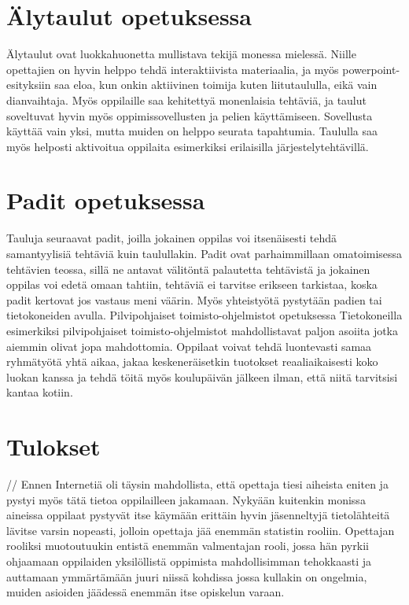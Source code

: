 \documentclass[utf8,bachelor]{gradu3}
\begin{document}
\section{Älytaulut opetuksessa}
Älytaulut ovat luokkahuonetta mullistava tekijä monessa mielessä. Niille opettajien on hyvin helppo tehdä interaktiivista materiaalia, ja myös powerpoint-esityksiin saa eloa, kun onkin aktiivinen toimija kuten liitutaululla, eikä vain dianvaihtaja. Myös oppilaille saa kehitettyä monenlaisia tehtäviä, ja taulut soveltuvat hyvin myös oppimissovellusten ja pelien käyttämiseen. Sovellusta käyttää vain yksi, mutta muiden on helppo seurata tapahtumia. Taululla saa myös helposti aktivoitua oppilaita esimerkiksi erilaisilla järjestelytehtävillä.

\section{Padit opetuksessa}
Tauluja seuraavat padit, joilla jokainen oppilas voi itsenäisesti tehdä samantyylisiä tehtäviä kuin taulullakin. Padit ovat parhaimmillaan omatoimisessa tehtävien teossa, sillä ne antavat välitöntä palautetta tehtävistä ja jokainen oppilas voi edetä omaan tahtiin, tehtäviä ei tarvitse erikseen tarkistaa, koska padit kertovat jos vastaus meni väärin. Myös yhteistyötä pystytään padien tai tietokoneiden avulla.
Pilvipohjaiset toimisto-ohjelmistot opetuksessa
Tietokoneilla esimerkiksi pilvipohjaiset toimisto-ohjelmistot mahdollistavat paljon asoiita jotka aiemmin olivat jopa mahdottomia. Oppilaat voivat tehdä luontevasti samaa ryhmätyötä yhtä aikaa, jakaa keskeneräisetkin tuotokset reaaliaikaisesti koko luokan kanssa ja tehdä töitä myös koulupäivän jälkeen ilman, että niitä tarvitsisi kantaa kotiin.


\section{Tulokset}
// Ennen Internetiä oli täysin mahdollista, että opettaja tiesi aiheista eniten ja pystyi myös tätä tietoa oppilailleen jakamaan. Nykyään kuitenkin monissa aineissa oppilaat pystyvät itse käymään erittäin hyvin jäsenneltyjä tietolähteitä lävitse varsin nopeasti, jolloin opettaja jää enemmän statistin rooliin. Opettajan rooliksi muotoutuukin entistä enemmän valmentajan rooli, jossa hän pyrkii ohjaamaan oppilaiden yksilöllistä oppimista mahdollisimman tehokkaasti ja auttamaan ymmärtämään juuri niissä kohdissa jossa kullakin on ongelmia, muiden asioiden jäädessä enemmän itse opiskelun varaan.
\end{document}
